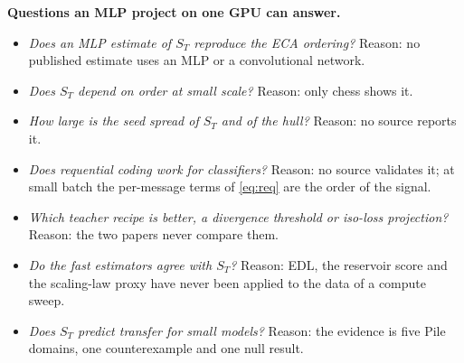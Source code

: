 \documentclass[11pt]{article}
\theoremstyle{tight}
\begin{document}
\begin{unsettled}
\textbf{Questions an MLP project on one GPU can answer.}
\begin{itemize}
\item \emph{Does an MLP estimate of $S_T$ reproduce the ECA ordering?} Reason: no published estimate
uses an MLP or a convolutional network.
\item \emph{Does $S_T$ depend on order at small scale?} Reason: only chess shows it.
\item \emph{How large is the seed spread of $S_T$ and of the hull?} Reason: no source reports it.
\item \emph{Does requential coding work for classifiers?} Reason: no source validates it; at small
batch the per-message terms of \eqref{eq:req} are the order of the signal.
\item \emph{Which teacher recipe is better, a divergence threshold or iso-loss projection?} Reason:
the two papers never compare them.
\item \emph{Do the fast estimators agree with $S_T$?} Reason: EDL, the reservoir score and the
scaling-law proxy have never been applied to the data of a compute sweep.
\item \emph{Does $S_T$ predict transfer for small models?} Reason: the evidence is five Pile domains,
one counterexample and one null result.
\end{itemize}
\end{unsettled}

\FloatBarrier



\appendix
\end{document}
